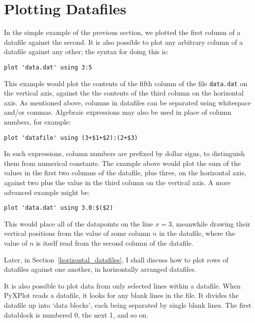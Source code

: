 \section{Plotting Datafiles}
\label{plot_datafiles}

In the simple example of the previous section, we plotted the first column of a
datafile against the second. It is also possible to plot any arbitrary column
of a datafile against any other; the syntax for doing this is:

\begin{verbatim}
plot 'data.dat' using 3:5
\end{verbatim}

\noindent This example would plot the contents of the fifth column of the file
{\tt data.dat} on the vertical axis, against the the contents of the third
column on the horizontal axis. As mentioned above, columns in datafiles can be
separated using whitespace and/or commas.  Algebraic expressions may also be
used in place of column numbers, for example:

\begin{verbatim}
plot 'datafile' using (3+$1+$2):(2+$3)
\end{verbatim}

\noindent In such expressions, column numbers are prefixed by dollar signs, to
distinguish them from numerical constants. The example above would plot the sum
of the values in the first two columns of the datafile, plus three, on the
horizontal axis, against two plus the value in the third column on the vertical
axis. A more advanced example might be:

\newpage %

\begin{verbatim}
plot 'data.dat' using 3.0:$($2)
\end{verbatim}

\noindent This would place all of the datapoints on the line $x=3$, meanwhile
drawing their vertical positions from the value of some column $n$ in the
datafile, where the value of $n$ is itself read from the second column of the
datafile.

Later, in Section~\ref{horizontal_datafiles}, I shall discuss how to plot rows
of datafiles against one another, in horizontally arranged datafiles.

It is also possible to plot data from only selected lines within a datafile.
When PyXPlot reads a datafile, it looks for any blank lines in the file. It
divides the datafile up into `data blocks', each being separated by single
blank lines. The first datablock is numbered 0, the next 1, and so on.

